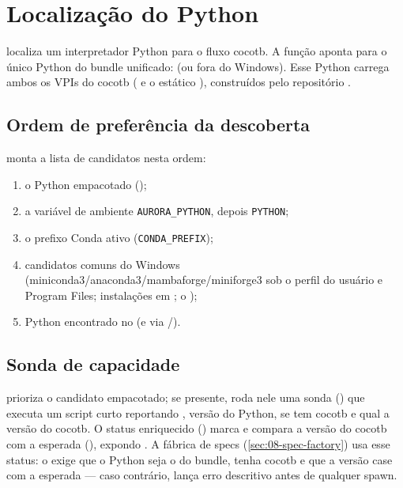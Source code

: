 \section{Localização do Python}
\label{sec:08-python}

 localiza um interpretador Python para o
fluxo cocotb. A função  aponta para o único Python do
bundle unificado:
 (ou  fora do
Windows). Esse Python carrega ambos os VPIs do cocotb
( e o estático ),
construídos pelo repositório .

\subsection{Ordem de preferência da descoberta}

 monta a lista de candidatos nesta ordem:

\begin{enumerate}[leftmargin=1.6em]
  \item o Python empacotado ();
  \item a variável de ambiente \lstinline|AURORA_PYTHON|, depois \lstinline|PYTHON|;
  \item o prefixo Conda ativo (\lstinline|CONDA_PREFIX|);
  \item candidatos comuns do Windows (miniconda3/anaconda3/mambaforge/miniforge3
    sob o perfil do usuário e Program Files; instalações em
    ; o );
  \item Python encontrado no  (e via /).
\end{enumerate}

\subsection{Sonda de capacidade}

 prioriza o candidato empacotado; se presente, roda nele
uma sonda () que executa um script curto reportando
, versão do Python, se tem cocotb e qual a versão do cocotb. O
status enriquecido () marca  e compara a versão
do cocotb com a esperada (), expondo
. A fábrica de specs (\autoref{sec:08-spec-factory}) usa esse
status: o  exige que o Python seja o do bundle, tenha cocotb e
que a versão case com a esperada — caso contrário, lança erro descritivo antes de
qualquer spawn.

